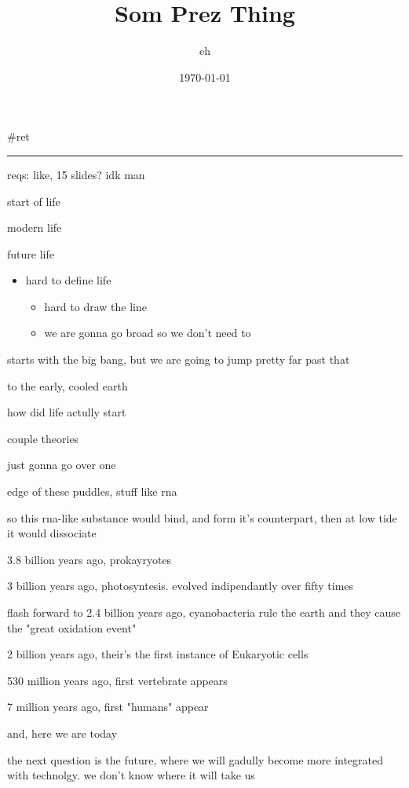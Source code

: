 \documentclass[letterpaper]{article}
\author{eh}
\date{\today}
\title{Som Prez Thing}
\renewcommand\maketitle{}
\begin{document}
\maketitle
\#ret

\noindent\rule{\textwidth}{0.5pt}

reqs: like, 15 slides? idk man

start of life

modern life

future life

\begin{itemize}
\item hard to define life

\begin{itemize}
\item hard to draw the line
\item we are gonna go broad so we don't need to
\end{itemize}
\end{itemize}

starts with the big bang, but we are going to jump pretty far past that

to the early, cooled earth

how did life actully start

couple theories

just gonna go over one

edge of these puddles, stuff like rna

so this rna-like substance would bind, and form it's counterpart, then
at low tide it would dissociate

3.8 billion years ago, prokayryotes

3 billion years ago, photosyntesis. evolved indipendantly over fifty
times

flash forward to 2.4 billion years ago, cyanobacteria rule the earth and
they cause the "great oxidation event"

2 billion years ago, their's the first instance of Eukaryotic cells

530 million years ago, first vertebrate appears

7 million years ago, first "humans" appear

and, here we are today

the next question is the future, where we will gadully become more
integrated with technolgy. we don't know where it will take us
\end{document}
